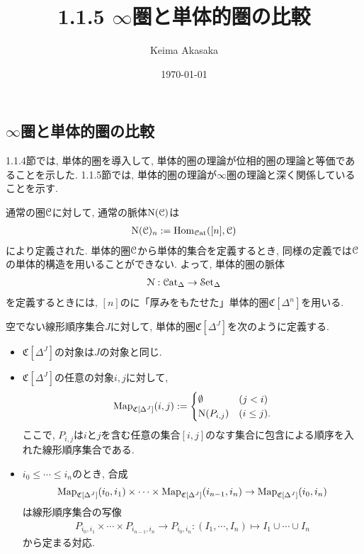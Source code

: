\documentclass[uplatex, a4paper, 14Q, dvipdfmx]{jsreport}
\title{1.1.5 \texorpdfstring{$\infty$}{infty}圏と単体的圏の比較}
\author{Keima Akasaka}
\date{\today}
\begin{document}

\setcounter{chapter}{1}
\setcounter{section}{1} 
\setcounter{subsection}{4}   
\setcounter{subsubsection}{1}

\subsection{\texorpdfstring{$\infty$}{infty}圏と単体的圏の比較}

1.1.4節では, 単体的圏を導入して, 単体的圏の理論が位相的圏の理論と等価であることを示した.
1.1.5節では, 単体的圏の理論が$\infty$圏の理論と深く関係していることを示す. 

通常の圏$\mathcal{C}$に対して, 通常の脈体$\mathrm{N}(\mathcal{C})$は
\begin{align*}
  \mathrm{N}(\mathcal{C})_n := \mathrm{Hom}_{\mathcal{C}\mathrm{at}}([n],\mathcal{C})
\end{align*}
により定義された. 
単体的圏$\mathcal{C}$から単体的集合を定義するとき, 同様の定義では$\mathcal{C}$の単体的構造を用いることができない. 
よって, 単体的圏の脈体
\begin{align*}
  \mathcal{N} : \mathcal{C}\mathrm{at}_{\Delta} \to \mathcal{S}\mathrm{et}_{\Delta}
\end{align*}
を定義するときには, $[n]$のに「厚みをもたせた」単体的圏$\mathfrak{C}[\Delta^n]$を用いる. 

\begin{definition} \label{def.1.1.5.1}
  空でない線形順序集合$J$に対して, 単体的圏$\mathfrak{C}[\Delta^J]$を次のように定義する. 
  \begin{itemize}
    \item $\mathfrak{C}[\Delta^J]$の対象は$J$の対象と同じ.
    \item $\mathfrak{C}[\Delta^J]$の任意の対象$i,j$に対して, 
    \begin{align*}
      \mathrm{Map}_{\mathfrak{C}[\Delta^J]}(i,j)
      := \begin{cases}
        \emptyset & (j < i) \\
        \mathrm{N}(P_{i,j}) & (i \leq j).
      \end{cases}
    \end{align*}
    ここで, $P_{i,j}$は$i$と$j$を含む任意の集合$[i,j]$のなす集合に包含による順序を入れた線形順序集合である. 
    \item $i_0 \leq \cdots \leq i_n$のとき, 合成 
    \begin{align*}
      \mathrm{Map}_{\mathfrak{C}[\Delta^J]}(i_0,i_1) \times \cdots \times \mathrm{Map}_{\mathfrak{C}[\Delta^J]}(i_{n-1},i_n) \to \mathrm{Map}_{\mathfrak{C}[\Delta^J]}(i_0,i_n)
    \end{align*}
    は線形順序集合の写像
    \begin{align*}
      P_{i_0,i_1} \times \cdots \times P_{i_{n-1},i_n} \to P_{i_0,i_n} : (I_1, \cdots, I_n) \mapsto I_1 \cup \cdots \cup I_n
    \end{align*}
    から定まる対応.
  \end{itemize}
\end{definition}
\end{document}

